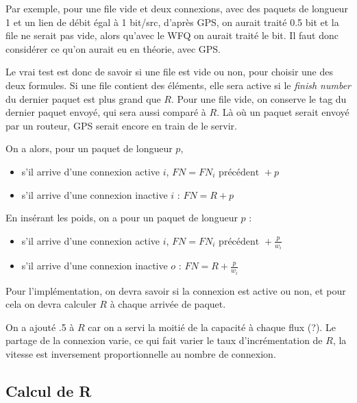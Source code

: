 			Par exemple, pour une file vide et deux connexions, avec des paquets de longueur 1 et un lien de débit égal à 1 bit/src, d'après GPS, on aurait traité 0.5 bit et la file ne serait pas vide, alors qu'avec le WFQ on aurait traité le bit. Il faut donc considérer ce qu'on aurait eu en théorie, avec GPS.
			
			Le vrai test est donc de savoir si une file est vide ou non, pour choisir une des deux formules. Si une file contient des éléments, elle sera active si le \textit{finish number} du dernier paquet est plus grand que $R$. Pour une file vide, on conserve le tag du dernier paquet envoyé, qui sera aussi comparé à $R$. Là où un paquet serait envoyé par un routeur, GPS serait encore en train de le servir.
			
			On a alors, pour un paquet de longueur $p$,
			
			\begin{itemize}
				\item s'il arrive d'une connexion active $i$, $FN = FN_i \text{ précédent } + p$
				\item s'il arrive d'une connexion inactive $i$ : $FN = R + p$
			\end{itemize}
			
			En insérant les poids, on a pour un paquet de longueur $p$ :
			
			\begin{itemize}
				\item s'il arrive d'une connexion active $i$, $FN = FN_i \text{ précédent } + \frac{p}{w_i}$
				\item s'il arrive d'une connexion inactive $o$ : $FN = R + \frac{p}{w_i}$
			\end{itemize}
			
			Pour l'implémentation, on devra savoir si la connexion est active ou non, et pour cela on devra calculer $R$ à chaque arrivée de paquet.
								
			
						
			On a ajouté .5 à $R$ car on a servi la moitié de la capacité à chaque flux (?). Le partage de la connexion varie, ce qui fait varier le taux d'incrémentation de $R$, la vitesse est inversement proportionnelle au nombre de connexion.
			
			
			
			\subsection{Calcul de R}
			
